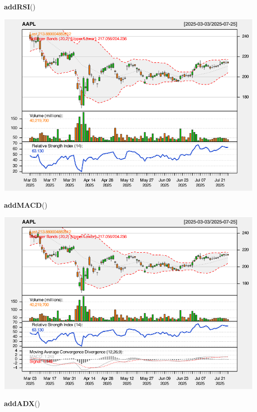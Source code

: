 \documentclass[]{ctexbook}
\newenvironment{Shaded}{\begin{snugshade}}{\end{snugshade}}
\newcommand{\FunctionTok}[1]{\textcolor[rgb]{0.13,0.29,0.53}{\textbf{#1}}}
\newcommand{\NormalTok}[1]{#1}
\begin{document}
\begin{Shaded}
\begin{Highlighting}[]
\FunctionTok{addRSI}\NormalTok{()}
\end{Highlighting}
\end{Shaded}

\includegraphics[width=0.9\linewidth]{QuantmodHandbook_files/figure-latex/bb_2-3}

\begin{Shaded}
\begin{Highlighting}[]
\FunctionTok{addMACD}\NormalTok{()}
\end{Highlighting}
\end{Shaded}

\includegraphics[width=0.9\linewidth]{QuantmodHandbook_files/figure-latex/bb_2-4}

\begin{Shaded}
\begin{Highlighting}[]
\FunctionTok{addADX}\NormalTok{()}
\end{Highlighting}
\end{Shaded}
\end{document}
